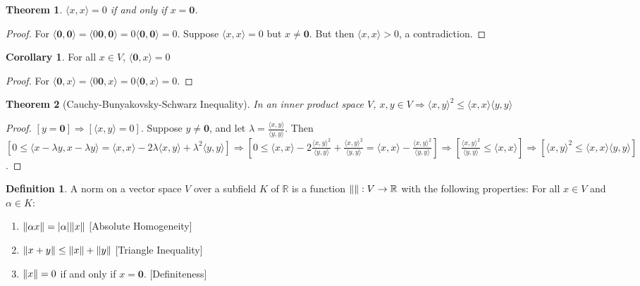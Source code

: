 \documentclass[oneside]{book}
\newtheorem{theorem}{Theorem}[section]
\theoremstyle{definition}
\newtheorem{definition}{Definition}[section]
\newtheorem{corollary}{Corollary}[section]
\newcommand*\B[1]{\mathbf{#1}}
\begin{document}
\begin{theorem}
$\langle x,x \rangle = 0$ if and only if $x= \B{0}$.
\end{theorem}
\begin{proof}
For $\langle \B{0}, \B{0} \rangle = \langle 0\B{0},\B{0} \rangle = 0 \langle \B{0},\B{0}\rangle = 0$. Suppose $\langle x,x \rangle =0$ but $x\ne \B{0}$. But then $\langle x,x \rangle >0$, a contradiction.
\end{proof}

\begin{corollary}
For all $x\in V$, $\langle \B{0},x \rangle = 0$
\end{corollary}
\begin{proof}
For $\langle \B{0}, x\rangle = \langle 0\B{0},x \rangle = 0\langle \B{0},x\rangle = 0$.
\end{proof}

\begin{theorem}[Cauchy-Bunyakovsky-Schwarz Inequality]
In an inner product space $V$, $x,y\in V\Rightarrow \langle x,y \rangle^2 \leq \langle x,x \rangle \langle y,y \rangle$
\end{theorem}
\begin{proof}
$[y=\B{0}]\Rightarrow [\langle x,y\rangle = 0]$. Suppose $y\ne \B{0}$, and let $\lambda = \frac{\langle x,y \rangle}{\langle y,y \rangle}$. Then $[0 \leq \langle x-\lambda y, x-\lambda y\rangle = \langle x,x \rangle - 2\lambda \langle x,y \rangle + \lambda^2 \langle y,y \rangle]\Rightarrow [0\leq \langle x,x \rangle - 2\frac{\langle x,y \rangle ^2 }{\langle y,y \rangle} + \frac{\langle x,y \rangle^2}{\langle y,y \rangle} = \langle x,x \rangle - \frac{\langle x,y \rangle^2}{\langle y,y \rangle}]\Rightarrow [\frac{\langle x,y \rangle ^2}{\langle y,y \rangle} \leq \langle x,x \rangle]\Rightarrow [\langle x,y \rangle^2 \leq \langle x,x \rangle \langle y,y \rangle]$.
\end{proof}

\begin{definition}
A norm on a vector space $V$ over a subfield $K$ of $\mathbb{R}$ is a function $\norm{}:V\rightarrow \mathbb{R}$ with the following properties: For all $x \in V$ and $\alpha \in K$:
\begin{enumerate}
\item $\norm{\alpha x} = |\alpha| \norm{x}$ \hfill [Absolute Homogeneity]
\item $\norm{x+y} \leq \norm{x}+\norm{y}$ \hfill [Triangle Inequality]
\item $\norm{x} = 0$ if and only if $x = \B{0}$. \hfill [Definiteness]
\end{enumerate}
\end{definition}
\end{document}
